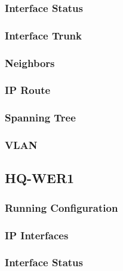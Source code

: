 \subsubsection{Interface Status}


\subsubsection{Interface Trunk}


\subsubsection{Neighbors}


\subsubsection{IP Route}


\subsubsection{Spanning Tree}


\subsubsection{VLAN}





\subsection{HQ-WER1}
\subsubsection{Running Configuration}


\subsubsection{IP Interfaces}


\subsubsection{Interface Status}


